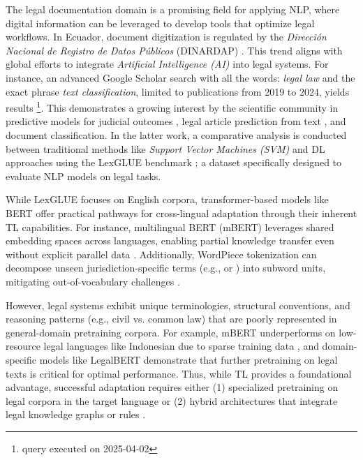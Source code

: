 \documentclass[onecolumn, journal, english, 12pt, a4paper]{IEEEtran} %
\theoremstyle{definition}
\begin{document}
The legal documentation domain is a promising field for applying NLP,
where digital information can be leveraged to develop tools that
optimize legal workflows. In Ecuador, document digitization is
regulated by the \emph{Dirección Nacional de Registro de Datos
  Públicos} (DINARDAP) \cite{dinardap2020}. This trend aligns with
global efforts to integrate \textit{Artificial Intelligence (AI)} into legal
systems. For instance, an advanced Google Scholar search with all the
words: \emph{ 
   legal law} and the exact phrase
\emph{text classification}, limited to publications from 2019 to 2024,
yields  results \footnote{query executed on
  2025-04-02}. This demonstrates a growing interest by the scientific
community in predictive models for judicial outcomes
\cite{mumcuouglu2021natural, kalia2022classifying, wang2020deep},
legal article prediction from text \cite{yan2019law}, and document
classification\cite{clavie2021}. In the latter work, a comparative
analysis is conducted between traditional methods like \emph{Support
  Vector Machines (SVM)} and DL approaches using the
LexGLUE benchmark \cite{lexglue2021}; a dataset specifically designed
to evaluate NLP models on legal tasks.

While LexGLUE focuses on English corpora, transformer-based models
like BERT \cite{devlin2018bert} offer practical pathways for
cross-lingual adaptation through their inherent TL
capabilities. For instance, multilingual BERT (mBERT) leverages shared
embedding spaces across languages, enabling partial knowledge transfer
even without explicit parallel data
\cite{pires2019multilingual}. Additionally, WordPiece tokenization can
decompose unseen jurisdiction-specific terms (e.g.,  or
) into subword units, mitigating
out-of-vocabulary challenges \cite{wu2016google}.

However, legal systems exhibit unique terminologies, structural
conventions, and reasoning patterns (e.g., civil vs. common law) that
are poorly represented in general-domain pretraining corpora. For
example, mBERT underperforms on low-resource legal languages like
Indonesian due to sparse training data \cite{savelka2021cross}, and
domain-specific models like LegalBERT \cite{chalkidis2020legal}
demonstrate that further pretraining on legal texts is critical for
optimal performance. Thus, while TL provides a
foundational advantage, successful adaptation requires either (1)
specialized pretraining on legal corpora in the target language or (2)
hybrid architectures that integrate legal knowledge graphs or rules
\cite{liu2022legal}.
\end{document}
